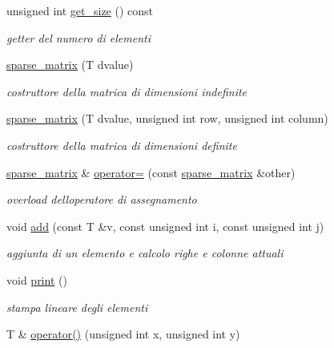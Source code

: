 \begin{DoxyCompactItemize}
unsigned int \hyperlink{classsparse__matrix_ad4970d9a545d5b92ddeb0ccbdb248ef9}{get\+\_\+size} () const
\begin{DoxyCompactList}\small\item\em getter del numero di elementi \end{DoxyCompactList}\item 
\hyperlink{classsparse__matrix_ae113bb914d2c00cc0fad5051c9584212}{sparse\+\_\+matrix} (T dvalue)
\begin{DoxyCompactList}\small\item\em costruttore della matrica di dimensioni indefinite \end{DoxyCompactList}\item 
\hyperlink{classsparse__matrix_a50752ee013539dc27ac4c6fe7445ba38}{sparse\+\_\+matrix} (T dvalue, unsigned int row, unsigned int column)
\begin{DoxyCompactList}\small\item\em costruttore della matrica di dimensioni definite \end{DoxyCompactList}\item 
\hyperlink{classsparse__matrix}{sparse\+\_\+matrix} \& \hyperlink{classsparse__matrix_a9f9e8f69ee9ccf89849ec9a6a6b320f6}{operator=} (const \hyperlink{classsparse__matrix}{sparse\+\_\+matrix} \&other)
\begin{DoxyCompactList}\small\item\em overload dell\textquotesingle{}operatore di assegnamento \end{DoxyCompactList}\item 
void \hyperlink{classsparse__matrix_a3d41cd3cf849711e8074e5622f722009}{add} (const T \&v, const unsigned int i, const unsigned int j)
\begin{DoxyCompactList}\small\item\em aggiunta di un elemento e calcolo righe e colonne attuali \end{DoxyCompactList}\item 
\mbox{\label{classsparse__matrix_ab88c766f7deb3769dfe0e4478aa25210}} 
void \hyperlink{classsparse__matrix_ab88c766f7deb3769dfe0e4478aa25210}{print} ()
\begin{DoxyCompactList}\small\item\em stampa lineare degli elementi \end{DoxyCompactList}\item 
T \& \hyperlink{classsparse__matrix_a3aa4aa24a43a2538b3e8c1371e01f006}{operator()} (unsigned int x, unsigned int y)

\end{DoxyCompactItemize}
